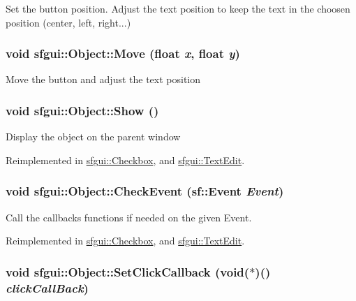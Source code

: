 Set the button position. Adjust the text position to keep the text in the choosen position (center, left, right...) \hypertarget{classsfgui_1_1Object_70b15fba99da515808d3da7d8042f458}{
\subsubsection[Move]{\setlength{\rightskip}{0pt plus 5cm}void sfgui::Object::Move (float {\em x}, \/  float {\em y})}}
\label{classsfgui_1_1Object_70b15fba99da515808d3da7d8042f458}




Move the button and adjust the text position \hypertarget{classsfgui_1_1Object_cdf7f9b5f731e49e0e13e55de704805d}{
\subsubsection[Show]{\setlength{\rightskip}{0pt plus 5cm}void sfgui::Object::Show ()}}
\label{classsfgui_1_1Object_cdf7f9b5f731e49e0e13e55de704805d}




Display the object on the parent window 

Reimplemented in \hyperlink{classsfgui_1_1Checkbox_0028c58d4579845c1bdf3cae7ec9af5a}{sfgui::Checkbox}, and \hyperlink{classsfgui_1_1TextEdit_1ee03247816213b34caaff365b160de0}{sfgui::TextEdit}.\hypertarget{classsfgui_1_1Object_cd9dbf2abe79e04c22f281bccb8bdb0e}{
\subsubsection[CheckEvent]{\setlength{\rightskip}{0pt plus 5cm}void sfgui::Object::CheckEvent (sf::Event {\em Event})}}
\label{classsfgui_1_1Object_cd9dbf2abe79e04c22f281bccb8bdb0e}




Call the callbacks functions if needed on the given Event. 

Reimplemented in \hyperlink{classsfgui_1_1Checkbox_d618a9010bef60b8ea2f11f893320fb8}{sfgui::Checkbox}, and \hyperlink{classsfgui_1_1TextEdit_af6d4be3633d3eb8bcc7a1007e324da8}{sfgui::TextEdit}.\hypertarget{classsfgui_1_1Object_d3d20a4cccde599748db724236ca0826}{
\subsubsection[SetClickCallback]{\setlength{\rightskip}{0pt plus 5cm}void sfgui::Object::SetClickCallback (void($\ast$)() {\em clickCallBack})}}
\label{classsfgui_1_1Object_d3d20a4cccde599748db724236ca0826}




